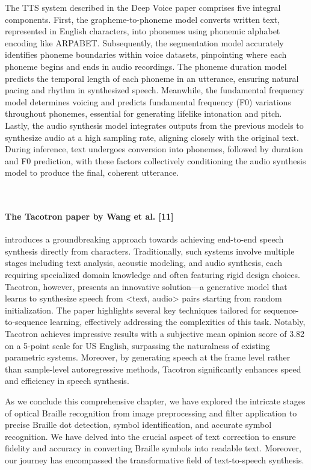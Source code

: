 The TTS system described in the Deep Voice paper comprises five integral components. First, the grapheme-to-phoneme model converts written text, represented in English characters, into phonemes using phonemic alphabet encoding like ARPABET. Subsequently, the segmentation model accurately identifies phoneme boundaries within voice datasets, pinpointing where each phoneme begins and ends in audio recordings. The phoneme duration model predicts the temporal length of each phoneme in an utterance, ensuring natural pacing and rhythm in synthesized speech. Meanwhile, the fundamental frequency model determines voicing and predicts fundamental frequency (F0) variations throughout phonemes, essential for generating lifelike intonation and pitch. Lastly, the audio synthesis model integrates outputs from the previous models to synthesize audio at a high sampling rate, aligning closely with the original text. During inference, text undergoes conversion into phonemes, followed by duration and F0 prediction, with these factors collectively conditioning the audio synthesis model to produce the final, coherent utterance.

\\
\paragraph{The Tacotron paper by Wang et al. [11]}
 introduces a groundbreaking approach towards achieving end-to-end speech synthesis directly from characters. Traditionally, such systems involve multiple stages including text analysis, acoustic modeling, and audio synthesis, each requiring specialized domain knowledge and often featuring rigid design choices. Tacotron, however, presents an innovative solution—a generative model that learns to synthesize speech from <text, audio> pairs starting from random initialization. The paper highlights several key techniques tailored for sequence-to-sequence learning, effectively addressing the complexities of this task. Notably, Tacotron achieves impressive results with a subjective mean opinion score of 3.82 on a 5-point scale for US English, surpassing the naturalness of existing parametric systems. Moreover, by generating speech at the frame level rather than sample-level autoregressive methods, Tacotron significantly enhances speed and efficiency in speech synthesis.

  As we conclude this comprehensive chapter, we have explored the intricate stages of optical Braille recognition from image preprocessing and filter application to precise Braille dot detection, symbol identification, and accurate symbol recognition. We have delved into the crucial aspect of text correction to ensure fidelity and accuracy in converting Braille symbols into readable text. Moreover, our journey has encompassed the transformative field of text-to-speech synthesis.

